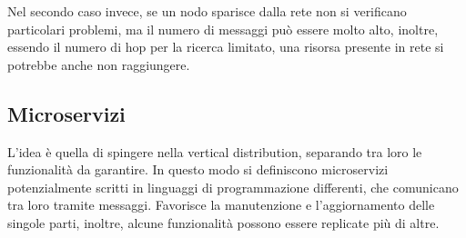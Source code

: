 Nel secondo caso invece, se un nodo sparisce dalla rete non si verificano 
particolari problemi, ma il numero di messaggi può essere molto alto, 
inoltre, essendo il numero di hop per la ricerca limitato, una risorsa 
presente in rete si potrebbe anche non raggiungere.

\subsection{Microservizi}
L'idea è quella di spingere nella vertical distribution, separando 
tra loro le funzionalità da garantire. In questo modo si definiscono microservizi
potenzialmente scritti in linguaggi di programmazione differenti, che comunicano 
tra loro tramite messaggi.
Favorisce la manutenzione e l'aggiornamento delle singole parti, inoltre, 
alcune funzionalità possono essere replicate più di altre.

